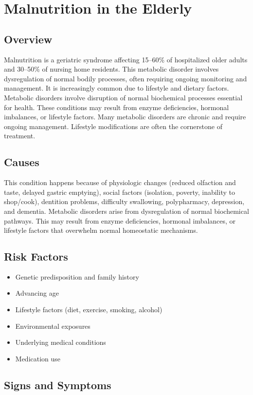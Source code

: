 \chapter{Malnutrition in the Elderly}
\label{sec:Malnutrition in the Elderly}

\section{Overview}
Malnutrition is a geriatric syndrome affecting 15--60\% of hospitalized older adults and 30--50\% of nursing home residents. This metabolic disorder involves dysregulation of normal bodily processes, often requiring ongoing monitoring and management. It is increasingly common due to lifestyle and dietary factors. Metabolic disorders involve disruption of normal biochemical processes essential for health. These conditions may result from enzyme deficiencies, hormonal imbalances, or lifestyle factors. Many metabolic disorders are chronic and require ongoing management. Lifestyle modifications are often the cornerstone of treatment.
\section{Causes}
This condition happens because of physiologic changes (reduced olfaction and taste, delayed gastric emptying), social factors (isolation, poverty, inability to shop/cook), dentition problems, difficulty swallowing, polypharmacy, depression, and dementia. Metabolic disorders arise from dysregulation of normal biochemical pathways. This may result from enzyme deficiencies, hormonal imbalances, or lifestyle factors that overwhelm normal homeostatic mechanisms.   
\section{Risk Factors}
\begin{itemize}[noitemsep]
  \item Genetic predisposition and family history
  \item Advancing age
  \item Lifestyle factors (diet, exercise, smoking, alcohol)
  \item Environmental exposures
  \item Underlying medical conditions
  \item Medication use
\end{itemize}
\section{Signs and Symptoms}
